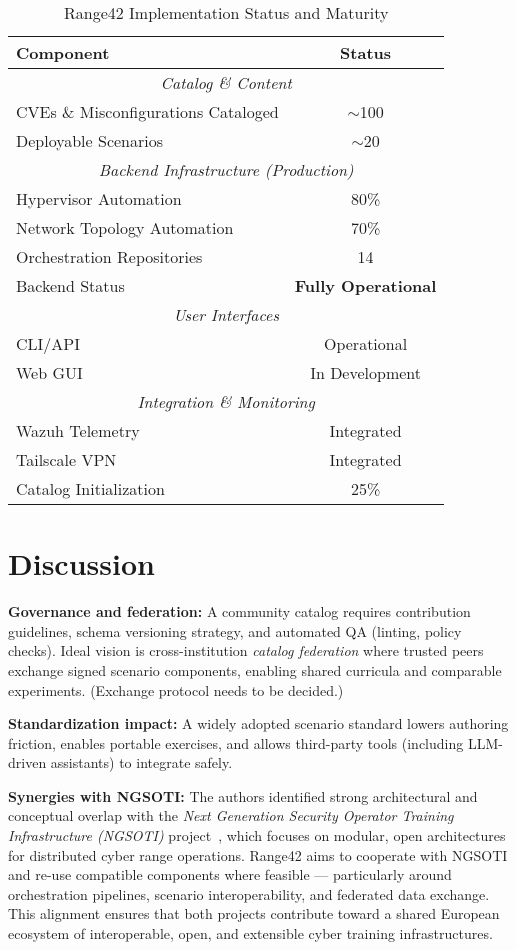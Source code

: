\documentclass[11pt]{article}
\begin{document}
\begin{table}[h]
\centering
\caption{Range42 Implementation Status and Maturity}
\label{tab:implementation}
\begin{tabular}{lc}
\hline
\textbf{Component} & \textbf{Status} \\
\hline
\multicolumn{2}{c}{\textit{Catalog \& Content}} \\
CVEs \& Misconfigurations Cataloged & $\sim$100 \\
Deployable Scenarios & $\sim$20 \\
\hline
\multicolumn{2}{c}{\textit{Backend Infrastructure (Production)}} \\
Hypervisor Automation & 80\% \\
Network Topology Automation & 70\% \\
Orchestration Repositories & 14 \\
Backend Status & \textbf{Fully Operational} \\
\hline
\multicolumn{2}{c}{\textit{User Interfaces}} \\
CLI/API & Operational \\
Web GUI & In Development \\
\hline
\multicolumn{2}{c}{\textit{Integration \& Monitoring}} \\
Wazuh Telemetry & Integrated \\
Tailscale VPN & Integrated \\
Catalog Initialization & 25\% \\
\hline
\end{tabular}
\end{table}

\section{Discussion}

\textbf{Governance and federation:} A community catalog requires contribution guidelines, schema versioning strategy, and automated QA (linting, policy checks).
Ideal vision is cross-institution \emph{catalog federation} where trusted peers exchange signed scenario components, enabling shared curricula and comparable experiments. (Exchange protocol needs to be decided.)

\textbf{Standardization impact:} A widely adopted scenario standard lowers authoring friction, enables portable exercises, and allows third-party tools (including LLM-driven assistants) to integrate safely.

\textbf{Synergies with NGSOTI:} The authors identified strong architectural and conceptual overlap with the \emph{Next Generation Security Operator Training Infrastructure (NGSOTI)} project~\cite{ngsoti}, 
which focuses on modular, open architectures for distributed cyber range operations. 
Range42 aims to cooperate with NGSOTI and re-use compatible components where feasible --- particularly around orchestration pipelines, scenario interoperability, and federated data exchange. 
This alignment ensures that both projects contribute toward a shared European ecosystem of interoperable, open, and extensible cyber training infrastructures.
\end{document}
